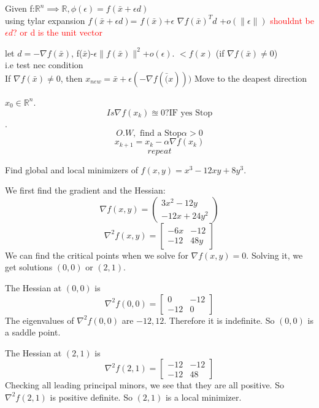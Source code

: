\begin{problem}
    Given f:$\mathbb{R}^n \implies \mathbb{R}, \phi(\epsilon)=f(\bar{x}+\epsilon d)$ 
    \\ using tylar expansion 
    $f(\bar{x}+\epsilon d)$=
    $f(\bar{x})$+$\epsilon$ $\nabla f(\bar{x})^T d$ +$o(\|\epsilon\|)$ \textcolor{red}{shouldnt be $\epsilon d$? or d is the unit vector}

    let $d=-\nabla f(\bar{x})$, f($\bar{x}$)-$\epsilon \| f(\bar{x})\|^2$+$o(\epsilon)$.
    $<f(x)$ (if $\nabla f(\bar{x})\neq 0$)
    \\ i.e test nec condition 
    \\ If $\nabla f(\bar{x})\neq 0$, then $x_{new}=\bar{x}+\epsilon(-\nabla f(\bar(x)))$
    Move to the deapest direction


    
\end{problem}

\begin{definition}
    $x_{0} \in \mathbb{R}^n$.   
    $$Is \nabla f(x_k)\approxeq 0?\text{IF yes Stop}$$.
    $$O.W, \text{ find a Stop} \alpha >0$$
    $$x_{k+1}=x_k-\alpha\nabla f(x_k)$$
    $$repeat$$
\end{definition}

\begin{problem}
    Find global and local minimizers of $f(x,y) = x^3 - 12xy + 8y^3$.
  
    \bigskip
    We first find the gradient and the Hessian:
    $$\nabla f(x,y) = \begin{pmatrix}
      3x^2 - 12y \\
      -12x + 24y^2
    \end{pmatrix}$$
    $$\nabla^2 f(x,y) = \begin{bmatrix}
      -6x & -12 \\
      -12 & 48y
    \end{bmatrix}$$
    We can find the critical points when we solve for $\nabla f(x,y) = 0$. Solving it, we get solutions $(0,0)$ or $(2,1)$.
  
    The Hessian at $(0,0)$ is $$\nabla^2 f(0,0) = \begin{bmatrix}
      0 & -12 \\
      -12 & 0
    \end{bmatrix}$$ The eigenvalues of $\nabla^2 f(0,0)$ are $-12, 12$. Therefore it is indefinite. So $(0,0)$ is a saddle point.
  
    The Hessian at $(2,1)$ is $$\nabla^2 f(2,1) = \begin{bmatrix}
      -12 & -12 \\
      -12 & 48
    \end{bmatrix}$$ Checking all leading principal minors, we see that they are all positive. So $\nabla^2 f(2,1)$ is positive definite. So $(2,1)$ is a local minimizer.
  \end{problem}

% 